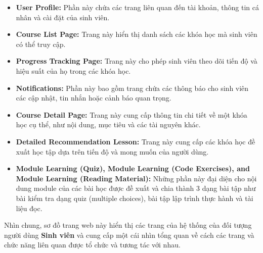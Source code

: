 \begin{itemize}
    \item \textbf{User Profile:} Phần này chứa các trang liên quan đến tài khoản, thông tin cá nhân và cài đặt của sinh viên.
    \item \textbf{Course List Page:} Trang này hiển thị danh sách các khóa học mà sinh viên có thể truy cập.
    \item \textbf{Progress Tracking Page:} Trang này cho phép sinh viên theo dõi tiến độ và hiệu suất của họ trong các khóa học.
    \item \textbf{Notifications:} Phần này bao gồm trang chứa các thông báo cho sinh viên các cập nhật, tin nhắn hoặc cảnh báo quan trọng.
    \item \textbf{Course Detail Page:} Trang này cung cấp thông tin chi tiết về một khóa học cụ thể, như nội dung, mục tiêu và các tài nguyên khác.
    \item \textbf{Detailed Recommendation Lesson:} Trang này cung cấp các khóa học đề xuất học tập dựa trên tiến độ và mong muốn của người dùng.
    \item \textbf{Module Learning (Quiz), Module Learning (Code Exercises), and Module Learning (Reading Material):} Những phần này đại diện cho nội dung module của các bài học được đề xuất và chia thành 3 dạng bài tập như bài kiểm tra dạng quiz (multiple choices), bài tập lập trình thực hành và tài liệu đọc.
\end{itemize}
\par Nhìn chung, sơ đồ trang web này hiển thị các trang của hệ thống của đối tượng người dùng \textbf{Sinh viên} và cung cấp một cái nhìn tổng quan về cách các trang và chức năng liên quan được tổ chức và tương tác với nhau.
